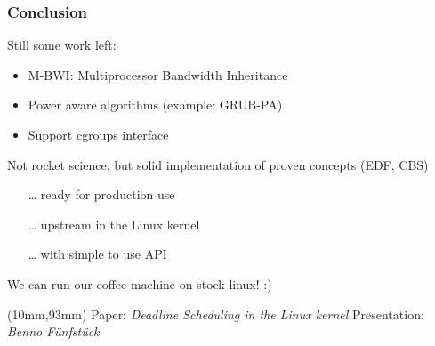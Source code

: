 \documentclass[aspectratio=1610,xcolor=svgnames]{beamer}
\begin{document}
\begin{frame}
  \frametitle{Conclusion} 
    Still some work left:
    \begin{itemize} 
      \item M-BWI: Multiprocessor Bandwidth Inheritance
      \item Power aware algorithms (example: GRUB-PA)
      \item Support cgroups interface
    \end{itemize}

    Not rocket science, but solid implementation of proven concepts (EDF, CBS)
    \begin{itemize}
      \item[\ldots] ready for production use
      \item[\ldots] upstream in the Linux kernel
      \item[\ldots] with simple to use API
    \end{itemize}

    We can run our coffee machine on stock linux! :)
      
  \begin{textblock*}{15cm}(10mm,93mm)
    \footnotesize{Paper: \textit{Deadline Scheduling in the Linux kernel}\hspace{1cm}
      Presentation: \textit{Benno Fünfstück}}
  \end{textblock*}
\end{frame}
\end{document}
